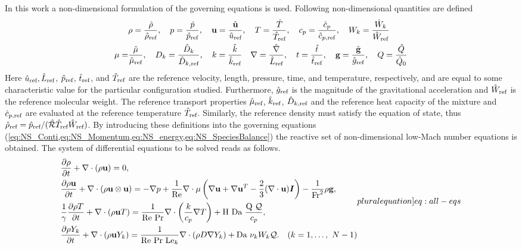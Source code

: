 In this work a non-dimensional formulation of the governing equations is used. Following non-dimensional quantities are defined
\begin{align*}
	      & \rho = \frac{\hat \rho}{\hat \rho_{\text{ref}}}, \quad
	p = \frac{\hat p}{\hat p_{\text{ref}}}, \quad
	\textbf{u}= \frac{\hat{\textbf{u}}}{\hat u_{\text{ref}}}, \quad
	T = \frac{\hat T}{\hat T_{\text{ref}}},  \quad
	c_p = \frac{\hat c_p}{\hat c_{p,\text{ref}}}, \quad
	W_k = \frac{\hat{W}_k}{\hat W_{\text{ref}}}
	\\
	\mu = & \frac{\hat \mu}{\hat \mu_{\text{ref}}},\quad
	D_k = \frac{\hat D_k}{\hat D_{k,\text{ref}}}, \quad
	k = \frac{\hat k}{\hat k_{\text{ref}}}\quad
	\nabla = \frac{\hat \nabla}{\hat L_{\text{ref}}}, \quad
	t = \frac{\hat{t}}{\hat t_{\text{ref}}},\quad
	\textbf{g} = \frac{\hat{\textbf{g}}}{\hat g_{\text{ref}}},\quad
	Q = \frac{\hat Q}{\hat{Q}_0}
\end{align*}
Here $\hat u_{\text{ref}}, \hat L_{\text{ref}}$, $\hat p_{\text{ref}}$, $\hat t_{\text{ref}}$, and $\hat T_{\text{ref}}$ are the reference velocity, length, pressure, time, and temperature, respectively, and are equal to some characteristic value for the particular configuration studied. Furthermore, $\hat g_{\text{ref}}$ is the magnitude of the gravitational acceleration and $\hat W_{\text{ref}}$ is the reference molecular weight. The reference transport properties $\hat \mu_{\text{ref}}$, $\hat k_{\text{ref}}$, $\hat D_{k,\text{ref}}$ and the reference heat capacity of the mixture and $\hat c_{p,\text{ref}}$ are evaluated at the reference temperature $\hat T_{\text{ref}}$. Similarly, the reference density must satisfy the equation of state, thus $\hat \rho_{\text{ref}} = \hat p_{\text{ref}}/(\hat{\mathcal{R}}\hat T_{\text{ref}}\hat W_{\text{ref}})$.  By introducing these definitions into the governing equations (\cref{eq:NS_Conti,eq:NS_Momentum,eq:NS_energy,eq:NS_SpeciesBalance}) the reactive set of non-dimensional low-Mach number equations is obtained. The system of differential equations to be solved reads as follows.
\begin{subequations}
	\begin{align}
		 & \pfrac{\rho}{t} + \nabla \cdot (\rho \vec{u})   = 0, \label{eq:LowMach_Conti}                                                                                                                                                                                                   \\
		 & \pfrac{\rho \vec{u}}{t} + \nabla \cdot (\rho \vec{u} \otimes \vec{u})   = - \nabla p + \frac{1}{\Rey}\nabla \cdot \mu\left( \nabla \vec{u} +\nabla \vec{u}^T  - \frac{2}{3}(\nabla\cdot \vec{u})\mytensor{I} \right)  - \frac{1}{\Fr^2}\rho\vec{g}, \label{eq:LowMach_Momentum} \\
		 &\frac{1}{\gamma} \pfrac{\rho T}{t} + \nabla \cdot (\rho \vec{u} T)  = \frac{1}{\text{Re}~\text{Pr}}\nabla \cdot\left(\frac{k}{c_p} \nabla T\right)+ \text{H}~\Da~\frac{\heatRelease~\mathcal{Q}}{c_p}, \label{eq:LowMachEnergy}                                                                  \\
		 & \pfrac{\rho Y_k}{t} +	\nabla \cdot (\rho  \vec{u}Y_k)   = \frac{1}{\text{Re}~\text{Pr}~\text{Le}_k}\nabla \cdot(\rho D \nabla Y_k)+  \Da~\stoicCoef_k W_k \mathcal{Q}. \quad (k = 1, \dots,~N - 1) \label{eq:LowMachMassBalance}
	\end{align}
	\label{eq:all-eq}\label[pluralequation]{eq:all-eqs}
\end{subequations}
